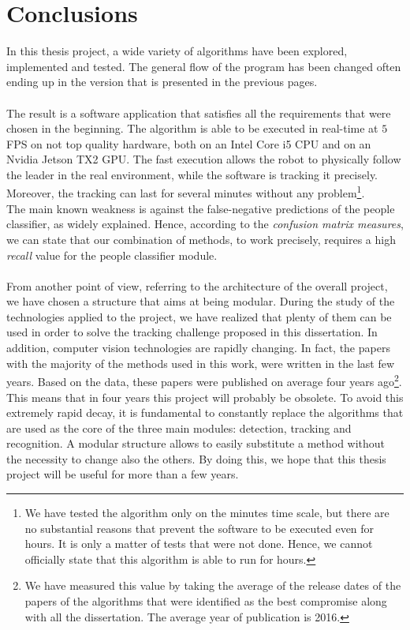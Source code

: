 \chapter{Conclusions} \label{cha:conclusions}
In this thesis project, a wide variety of algorithms have been explored, implemented and tested. The general flow of the program has been changed often ending up in the version that is presented in the previous pages.\\
\\
The result is a software application that satisfies all the requirements that were chosen in the beginning. The algorithm is able to be executed in real-time at $5$ FPS on not top quality hardware, both on an Intel Core i5 CPU and on an Nvidia Jetson TX2 GPU. The fast execution allows the robot to physically follow the leader in the real environment, while the software is tracking it precisely. Moreover, the tracking can last for several minutes without any problem\footnote{We have tested the algorithm only on the minutes time scale, but there are no substantial reasons that prevent the software to be executed even for hours. It is only a matter of tests that were not done. Hence, we cannot officially state that this algorithm is able to run for hours.}.\\
The main known weakness is against the false-negative predictions of the people classifier, as widely explained. Hence, according to the \textit{confusion matrix measures}, we can state that our combination of methods, to work precisely, requires a high \textit{recall} value for the people classifier module.\\
\\
From another point of view, referring to the architecture of the overall project, we have chosen a structure that aims at being modular. During the study of the technologies applied to the project, we have realized that plenty of them can be used in order to solve the tracking challenge proposed in this dissertation. In addition, computer vision technologies are rapidly changing. In fact, the papers with the majority of the methods used in this work, were written in the last few years. Based on the data, these papers were published on average four years ago\footnote{We have measured this value by taking the average of the release dates of the papers of the algorithms that were identified as the best compromise along with all the dissertation. The average year of publication is 2016.}.\\
This means that in four years this project will probably be obsolete. To avoid this extremely rapid decay, it is fundamental to constantly replace the algorithms that are used as the core of the three main modules: detection, tracking and recognition. A modular structure allows to easily substitute a method without the necessity to change also the others. By doing this, we hope that this thesis project will be useful for more than a few years.


